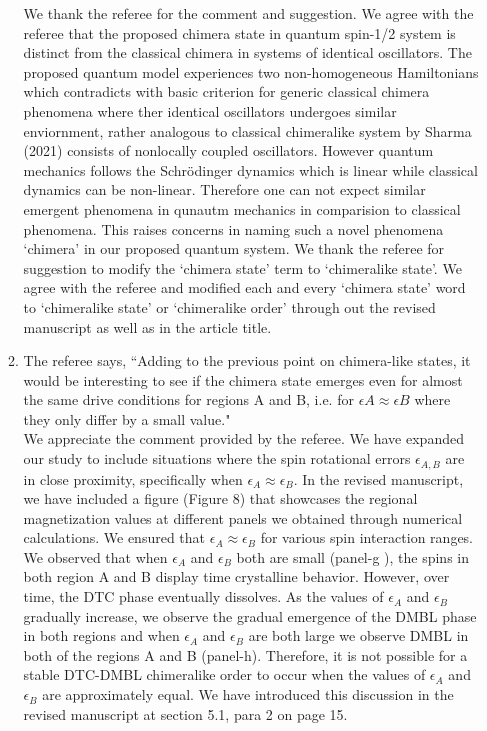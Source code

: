 \documentclass[aps,prb,reprint,showpacs,floatfix,superscriptaddress, onecolumn, nofootinbib, 10pt]{revtex4-2}
\newcommand{\response}[1]{{\color{black}#1}} %
\newcommand{\comment}[1]{{\color{blue}#1}} %
\begin{document}
\begin{enumerate}
\begin{enumerate}
			\response{We thank the referee for the comment and suggestion. We agree with the referee that the proposed chimera state in quantum spin-1/2 system is distinct from the classical chimera in systems of identical oscillators. The proposed quantum model experiences two non-homogeneous Hamiltonians which contradicts with basic criterion for generic classical chimera phenomena where ther identical oscillators undergoes similar enviornment, rather analogous to classical chimeralike system by Sharma (2021) consists of nonlocally coupled oscillators. However quantum mechanics follows the Schr\"{o}dinger dynamics which is linear while classical dynamics can be non-linear. Therefore one can not expect similar emergent phenomena in qunautm mechanics in comparision to classical phenomena. This raises concerns in naming such a novel phenomena `chimera' in our proposed quantum system. We thank the referee for suggestion to modify the `chimera state' term to `chimeralike state'. We agree with the referee and modified each and every `chimera state' word to `chimeralike state' or `chimeralike order' through out the revised manuscript as well as in the article title.}\\
		
		\item The referee says, \comment{``Adding to the previous point on chimera-like states, it would be interesting to see if the chimera state emerges even for almost the same drive conditions for regions A and B, i.e. for $\epsilon A \approx \epsilon B$ where they only differ by a small value."}\\	
			
		\response{	
		We appreciate the comment provided by the referee. We have expanded our study to include situations where the spin rotational errors $\epsilon_{A,B}$ are in close proximity, specifically when $\epsilon_A \approx \epsilon_B$. In the revised manuscript, we have included a figure (Figure 8) that showcases the regional magnetization values at different panels we obtained through numerical calculations. We ensured that $\epsilon_A \approx \epsilon_B$ for various spin interaction ranges. We observed that when $\epsilon_A$ and $\epsilon_B$ both are small (panel-g ), the spins in both region A and B display time crystalline behavior. However, over time, the DTC phase eventually dissolves. As the values of $\epsilon_A$ and $\epsilon_B$ gradually increase, we observe the gradual emergence of the DMBL phase in both regions and when $\epsilon_A$ and $\epsilon_B$ are both large we observe DMBL in both of the regions A and B (panel-h). Therefore, it is not possible for a stable DTC-DMBL chimeralike order to occur when the values of $\epsilon_A$ and $\epsilon_B$ are approximately equal. We have introduced this discussion in the revised manuscript at section 5.1, para 2 on page 15.
		}\\
	

\end{enumerate}
\end{enumerate}
\end{document}
